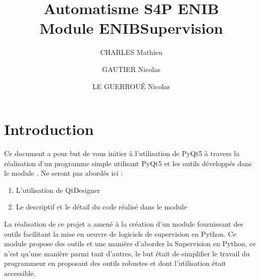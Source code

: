 \documentclass[12pt]{report}    %
\begin{document}
\title{Automatisme S4P ENIB \protect\\ Module ENIBSupervision}
\author{CHARLES Mathieu \and GAUTIER Nicolas \and LE GUERROUÉ Nicolas}  
\maketitle

\tableofcontents




\chapter{Introduction}

Ce document a pour but de vous initier à l'utilisation de PyQt5 à travers la réalisation d'un programme simple utilisant PyQt5 et les outils développés dans le module .\newline
Ne seront pas abordés ici :
\begin{enumerate}
\item L'utilisation de QtDesigner
\item Le descriptif et le détail du code réalisé dans le module 
\end{enumerate}

\smallSkip
La réalisation de ce projet a amené à la création d'un module  fournissant des outils facilitant la mise en oeuvre de logiciels de supervision en Python.\newline
Ce module propose des outils et une manière d'aborder la Supervision en Python, ce n'est qu'une manière parmi tant d'autres, le but était de simplifier le travail du programmeur en proposant des outils robustes et dont l'utilisation était accessible.



\end{document}
